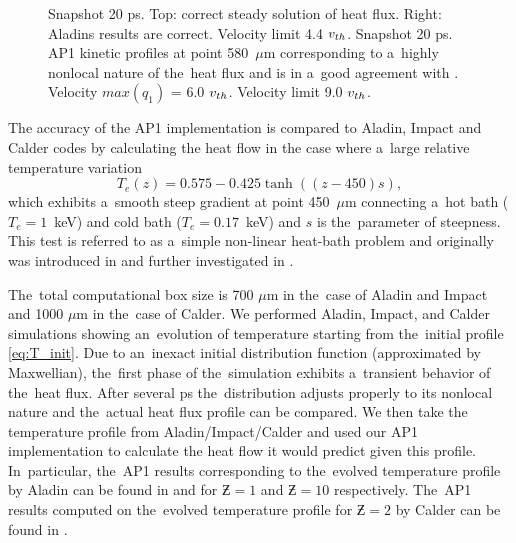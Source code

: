 \begin{figure}[tbh]
\begin{center}
\begin{tabular}{c}
    \end{tabular}
  \caption{  
  Snapshot 20 ps. Top: correct steady solution of heat flux. 
  Right: Aladins results are correct. Velocity limit 4.4 $v_{th}$.
  Snapshot 20 ps. AP1 kinetic profiles at point 580~$\mu$m corresponding to 
  a~highly nonlocal nature of the~heat flux %
  and is in a~good agreement with
  \cite{Sherlock_PoP2017}. Velocity $max(q_1)$ = 6.0 $v_{th}$. 
  Velocity limit 9.0 $v_{th}$.
  }
  \label{fig:C7_Aladin_case5}
  \end{center} 
\end{figure}

The accuracy of the AP1 implementation is compared to Aladin, Impact and Calder
codes by calculating the heat flow in the case
where a~large relative temperature variation
\begin{equation}
  T_e(z) = 0.575 - 0.425 \tanh\left((z-450) s\right) ,
  \label{eq:T_init}
\end{equation}
which exhibits a~smooth steep gradient at point 450~$\mu$m 
connecting a~hot bath ($T_e = 1$~keV) 
and cold bath ($T_e = 0.17$~keV) and $s$ is the~parameter of steepness. 
This test is referred to as a~simple non-linear heat-bath problem and
originally was introduced in \cite{marocchino2013} and further investigated
in  \cite{Sorbo_2015, Sorbo_2016, Sherlock_PoP2017, Brodrick_PoP2017}.


The~total computational box size is 700 $\mu$m in the~case
of Aladin and Impact and 1000 $\mu$m in the~case of Calder.
We performed Aladin, Impact, and Calder simulations showing an~evolution of
temperature starting from the~initial profile \eqref{eq:T_init}. 
Due to an~inexact initial distribution function (approximated by Maxwellian),
the~first phase of the~simulation exhibits a~transient behavior of the~heat
flux. After several ps the~distribution adjusts properly to its nonlocal nature
and the~actual heat flux profile can be compared. 
We then take the temperature profile from Aladin/Impact/Calder and used 
our AP1 implementation to calculate the heat flow
it would predict given this profile. In~particular, the~AP1 results 
corresponding to the~evolved temperature profile by Aladin can be found
in  and  for 
$\Zbar = 1$ and $\Zbar = 10$ respectively. The~AP1 results computed on
the~evolved temperature profile for $\Zbar = 2$ 
by Calder can be found in .

